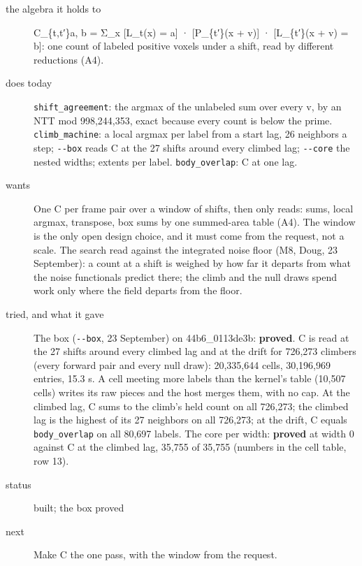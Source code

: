 \begin{description}
\item[{the algebra it holds to}] C\_\allowbreak{}\{t,t′\}a, b = Σ\_\allowbreak{}x [L\_\allowbreak{}t(x) = a] · [P\_\allowbreak{}\{t′\}(x + v)] · [L\_\allowbreak{}\{t′\}(x + v) = b]: one count of labeled positive voxels under a shift, read by different reductions (A4).
\item[{does today}] \texttt{shift\_\allowbreak{}agreement}: the argmax of the unlabeled sum over every v, by an NTT mod 998,244,353, exact because every count is below the prime. \texttt{climb\_\allowbreak{}machine}: a local argmax per label from a start lag, 26 neighbors a step; \texttt{-\allowbreak{}-\allowbreak{}box} reads C at the 27 shifts around every climbed lag; \texttt{-\allowbreak{}-\allowbreak{}core} the nested widths; extents per label. \texttt{body\_\allowbreak{}overlap}: C at one lag.
\item[{wants}] One C per frame pair over a window of shifts, then only reads: sums, local argmax, transpose, box sums by one summed-area table (A4). The window is the only open design choice, and it must come from the request, not a scale. The search read against the integrated noise floor (M8, Doug, 23 September): a count at a shift is weighed by how far it departs from what the noise functionals predict there; the climb and the null draws spend work only where the field departs from the floor.
\item[{tried, and what it gave}] The box (\texttt{-\allowbreak{}-\allowbreak{}box}, 23 September) on 44b6\_\allowbreak{}0113de3b: \textbf{proved}. C is read at the 27 shifts around every climbed lag and at the drift for 726,273 climbers (every forward pair and every null draw): 20,335,644 cells, 30,196,969 entries, 15.3 s. A cell meeting more labels than the kernel's table (10,507 cells) writes its raw pieces and the host merges them, with no cap. At the climbed lag, C sums to the climb's held count on all 726,273; the climbed lag is the highest of its 27 neighbors on all 726,273; at the drift, C equals \texttt{body\_\allowbreak{}overlap} on all 80,697 labels. The core per width: \textbf{proved} at width 0 against C at the climbed lag, 35,755 of 35,755 (numbers in the cell table, row 13).
\item[{status}] built; the box proved
\item[{next}] Make C the one pass, with the window from the request.
\end{description}


